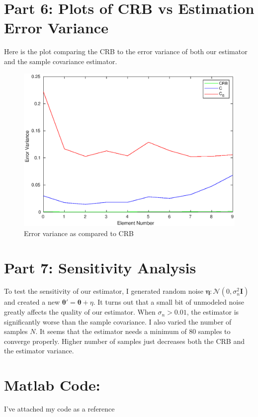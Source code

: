 \documentclass[a4paper]{article}
\begin{document}
  \section*{Part 6: Plots of CRB vs Estimation Error Variance}%
  Here is the plot comparing the CRB to the error variance of both our estimator and the sample covariance estimator. 
  \begin{figure}[H]
  \begin{center}
    \includegraphics[scale=0.8]{plot_part_6.eps}
  \end{center}
  \caption{Error variance as compared to CRB}
  \end{figure}

  \section*{Part 7: Sensitivity Analysis}%
  To test the sensitivity of our estimator, I generated random noise $\bm{\eta}: \mathcal{N}(0, \sigma_n^2 \mathbf{I})$ and created a new $\bm{\theta}' = \bm{\theta} + \eta$. It turns out that a small bit of unmodeled noise greatly affects the quality of our estimator. When $\sigma_n > 0.01$, the estimator is significantly worse than the sample covariance. I also varied the number of samples $N$. It seems that the estimator needs a minimum of 80 samples to converge properly. Higher number of samples just decreases both the CRB and the estimator variance.

  \section*{Matlab Code:}%
  
 
  I've attached my code as a reference
  
\end{document}
